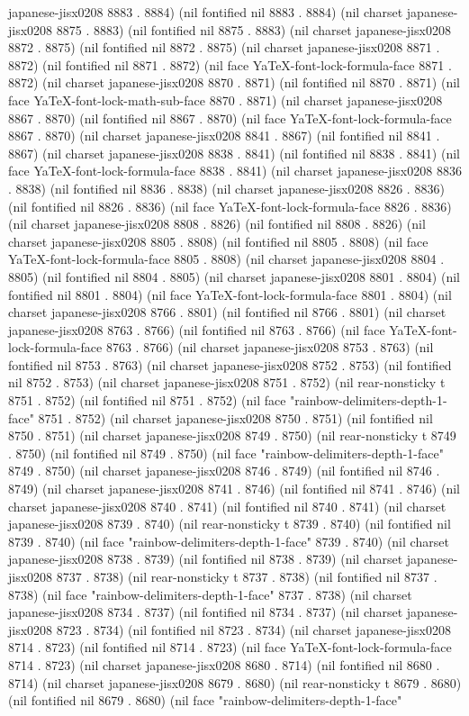 japanese-jisx0208 8883 . 8884) (nil fontified nil 8883 . 8884) (nil charset japanese-jisx0208 8875 . 8883) (nil fontified nil 8875 . 8883) (nil charset japanese-jisx0208 8872 . 8875) (nil fontified nil 8872 . 8875) (nil charset japanese-jisx0208 8871 . 8872) (nil fontified nil 8871 . 8872) (nil face YaTeX-font-lock-formula-face 8871 . 8872) (nil charset japanese-jisx0208 8870 . 8871) (nil fontified nil 8870 . 8871) (nil face YaTeX-font-lock-math-sub-face 8870 . 8871) (nil charset japanese-jisx0208 8867 . 8870) (nil fontified nil 8867 . 8870) (nil face YaTeX-font-lock-formula-face 8867 . 8870) (nil charset japanese-jisx0208 8841 . 8867) (nil fontified nil 8841 . 8867) (nil charset japanese-jisx0208 8838 . 8841) (nil fontified nil 8838 . 8841) (nil face YaTeX-font-lock-formula-face 8838 . 8841) (nil charset japanese-jisx0208 8836 . 8838) (nil fontified nil 8836 . 8838) (nil charset japanese-jisx0208 8826 . 8836) (nil fontified nil 8826 . 8836) (nil face YaTeX-font-lock-formula-face 8826 . 8836) (nil charset japanese-jisx0208 8808 . 8826) (nil fontified nil 8808 . 8826) (nil charset japanese-jisx0208 8805 . 8808) (nil fontified nil 8805 . 8808) (nil face YaTeX-font-lock-formula-face 8805 . 8808) (nil charset japanese-jisx0208 8804 . 8805) (nil fontified nil 8804 . 8805) (nil charset japanese-jisx0208 8801 . 8804) (nil fontified nil 8801 . 8804) (nil face YaTeX-font-lock-formula-face 8801 . 8804) (nil charset japanese-jisx0208 8766 . 8801) (nil fontified nil 8766 . 8801) (nil charset japanese-jisx0208 8763 . 8766) (nil fontified nil 8763 . 8766) (nil face YaTeX-font-lock-formula-face 8763 . 8766) (nil charset japanese-jisx0208 8753 . 8763) (nil fontified nil 8753 . 8763) (nil charset japanese-jisx0208 8752 . 8753) (nil fontified nil 8752 . 8753) (nil charset japanese-jisx0208 8751 . 8752) (nil rear-nonsticky t 8751 . 8752) (nil fontified nil 8751 . 8752) (nil face "rainbow-delimiters-depth-1-face" 8751 . 8752) (nil charset japanese-jisx0208 8750 . 8751) (nil fontified nil 8750 . 8751) (nil charset japanese-jisx0208 8749 . 8750) (nil rear-nonsticky t 8749 . 8750) (nil fontified nil 8749 . 8750) (nil face "rainbow-delimiters-depth-1-face" 8749 . 8750) (nil charset japanese-jisx0208 8746 . 8749) (nil fontified nil 8746 . 8749) (nil charset japanese-jisx0208 8741 . 8746) (nil fontified nil 8741 . 8746) (nil charset japanese-jisx0208 8740 . 8741) (nil fontified nil 8740 . 8741) (nil charset japanese-jisx0208 8739 . 8740) (nil rear-nonsticky t 8739 . 8740) (nil fontified nil 8739 . 8740) (nil face "rainbow-delimiters-depth-1-face" 8739 . 8740) (nil charset japanese-jisx0208 8738 . 8739) (nil fontified nil 8738 . 8739) (nil charset japanese-jisx0208 8737 . 8738) (nil rear-nonsticky t 8737 . 8738) (nil fontified nil 8737 . 8738) (nil face "rainbow-delimiters-depth-1-face" 8737 . 8738) (nil charset japanese-jisx0208 8734 . 8737) (nil fontified nil 8734 . 8737) (nil charset japanese-jisx0208 8723 . 8734) (nil fontified nil 8723 . 8734) (nil charset japanese-jisx0208 8714 . 8723) (nil fontified nil 8714 . 8723) (nil face YaTeX-font-lock-formula-face 8714 . 8723) (nil charset japanese-jisx0208 8680 . 8714) (nil fontified nil 8680 . 8714) (nil charset japanese-jisx0208 8679 . 8680) (nil rear-nonsticky t 8679 . 8680) (nil fontified nil 8679 . 8680) (nil face "rainbow-delimiters-depth-1-face" 